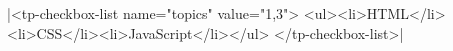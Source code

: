 \documentclass{article}
\begin{document}
\rawhtml|<tp-checkbox-list name="topics" value="1,3">
    <ul><li>HTML</li><li>CSS</li><li>JavaScript</li></ul>
  </tp-checkbox-list>|
\end{document}
